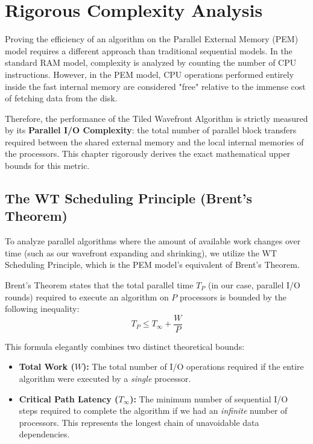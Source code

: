 
\chapter{Rigorous Complexity Analysis}

Proving the efficiency of an algorithm on the Parallel External Memory (PEM) model requires a different approach than traditional sequential models. In the standard RAM model, complexity is analyzed by counting the number of CPU instructions. However, in the PEM model, CPU operations performed entirely inside the fast internal memory are considered "free" relative to the immense cost of fetching data from the disk. 

Therefore, the performance of the Tiled Wavefront Algorithm is strictly measured by its \textbf{Parallel I/O Complexity}: the total number of parallel block transfers required between the shared external memory and the local internal memories of the processors. This chapter rigorously derives the exact mathematical upper bounds for this metric.

\section{The WT Scheduling Principle (Brent's Theorem)}
To analyze parallel algorithms where the amount of available work changes over time (such as our wavefront expanding and shrinking), we utilize the WT Scheduling Principle, which is the PEM model's equivalent of Brent's Theorem\cite{jaja-ipa-92,sajith-spem-23}.

Brent's Theorem states that the total parallel time $T_P$ (in our case, parallel I/O rounds) required to execute an algorithm on $P$ processors is bounded by the following inequality:
$$T_P \le T_\infty + \frac{W}{P}$$

This formula elegantly combines two distinct theoretical bounds:
\begin{itemize}
    \item \textbf{Total Work ($W$):} The total number of I/O operations required if the entire algorithm were executed by a \textit{single} processor.
    \item \textbf{Critical Path Latency ($T_\infty$):} The minimum number of sequential I/O steps required to complete the algorithm if we had an \textit{infinite} number of processors. This represents the longest chain of unavoidable data dependencies.
\end{itemize}

